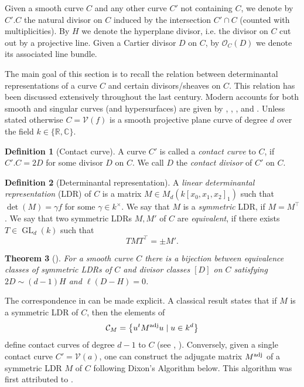 \documentclass[a4paper,10pt]{amsart}
\theoremstyle{definition}
\newtheorem{defin}{Definition}[section]
\theoremstyle{plain}
\newtheorem{thm}[defin]{Theorem}
\newcommand{\cC}{{\mathcal C}}
\newcommand{\cO}{{\mathcal O}}
\newcommand{\cV}{{\mathcal V}}
\newcommand{\C}{{\mathbb C}}
\newcommand{\R}{{\mathbb R}}
\begin{document}
Given a smooth curve $C$ and any other curve $C'$ not containing $C$, we denote by $C'.C$ the natural divisor on $C$ induced by the intersection $C'\cap C$ (counted with multiplicities). By $H$ we denote the hyperplane divisor, i.e. the divisor on $C$ cut out by a projective line. Given a Cartier divisor $D$ on $C$, by $\cO_C(D)$ we denote its associated line bundle.


The main goal of this section is to recall the relation between determinantal representations of a curve $C$ and certain divisors/sheaves on $C$. This relation has been discussed extensively throughout the last century. Modern accounts for both smooth and singular curves (and hypersurfaces) are given by \cite{Vinnikov1989LDR}, \cite{Beauville2000DetHypSurf}, \cite{KernerVinnikov2012singularDetRep}, and \cite[\S4]{Dolgachev2012CAG}. Unless stated otherwise $C = \cV(f)$ is a smooth projective plane curve of degree $d$ over the field $k \in \{\R, \C\}$.

\begin{defin}[Contact curve]
 A curve $C'$ is called a \emph{contact curve} to $C$, if $C'.C = 2D$ for some divisor $D$ on $C$. We call $D$ the \emph{contact divisor} of $C'$ on $C$.
\end{defin}

\begin{defin}[Determinantal representation]
 A \emph{linear determinantal representation} (LDR) of $C$ is a matrix $M \in M_d(k[x_0,x_1,x_2]_1)$ such that $\det(M) = \gamma f$ for some $\gamma \in k^\times$. We say that $M$ is a \emph{symmetric} LDR, if $M = M^\top$. We say that two symmetric LDRs $M, M'$ of $C$ are \emph{equivalent}, if there exists $T \in \operatorname{GL}_d(k)$ such that
 \begin{equation*}
     T M T^\top = \pm M'.
 \end{equation*}
\end{defin}

\begin{thm}[{\cite[Theorem 5]{Vinnikov1989LDR}}] \label{thm:contDiv=LDR}
 For a smooth curve $C$ there is a bijection between equivalence classes of symmetric LDRs of $C$ and divisor classes $[D]$ on $C$ satisfying $2D \sim (d-1)H$ and $\ell(D-H) = 0$.
\end{thm}

The correspondence in  can be made explicit. A classical result states that if $M$ is a symmetric LDR of $C$, then the elements of  
\begin{equation*}
    \cC_M = \left\lbrace u^tM^{\textup{adj}}u \mid u \in k^d \right\rbrace
\end{equation*}
define contact curves of degree $d-1$ to $C$ (see \cite[Theorem 5]{Vinnikov1989LDR}, \cite[\S 4.1.4]{Dolgachev2012CAG}). Conversely, given a single contact curve $C' = \cV(a)$, one can construct the adjugate matrix $M^{\textup{adj}}$ of a symmetric LDR $M$ of $C$ following Dixon's Algorithm below. This algorithm was first attributed to \cite{Dixon1902Constr}.
\end{document}
